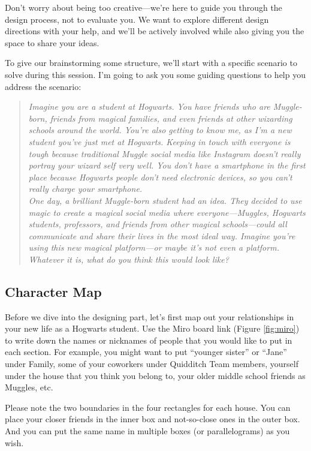 Don't worry about being too creative---we're here to guide you through the design process, not to evaluate you. We want to explore different design directions with your help, and we'll be actively involved while also giving you the space to share your ideas.

To give our brainstorming some structure, we'll start with a specific scenario to solve during this session. I'm going to ask you some guiding questions to help you address the scenario:

\begin{quote}
\textit{Imagine you are a student at Hogwarts. You have friends who are Muggle-born, friends from magical families, and even friends at other wizarding schools around the world. You're also getting to know me, as I'm a new student you've just met at Hogwarts. Keeping in touch with everyone is tough because traditional Muggle social media like Instagram doesn't really portray your wizard self very well. You don't have a smartphone in the first place because Hogwarts people don't need electronic devices, so you can't really charge your smartphone.}\\
\textit{One day, a brilliant Muggle-born student had an idea. They decided to use magic to create a magical social media where everyone---Muggles, Hogwarts students, professors, and friends from other magical schools---could all communicate and share their lives in the most ideal way. Imagine you're using this new magical platform---or maybe it's not even a platform. Whatever it is, what do you think this would look like?}
\end{quote}

\subsection*{Character Map}
Before we dive into the designing part, let's first map out your relationships in your new life as a Hogwarts student. Use the Miro board link (Figure \ref{fig:miro}) to write down the names or nicknames of people that you would like to put in each section. For example, you might want to put ``younger sister'' or ``Jane'' under Family, some of your coworkers under Quidditch Team members, yourself under the house that you think you belong to, your older middle school friends as Muggles, etc.

Please note the two boundaries in the four rectangles for each house. You can place your closer friends in the inner box and not-so-close ones in the outer box. And you can put the same name in multiple boxes (or parallelograms) as you wish.

